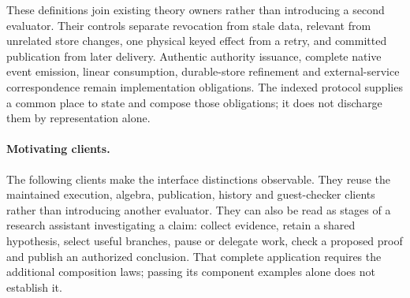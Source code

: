 \documentclass[11pt]{article}
\theoremstyle{definition}
\theoremstyle{remark}
\begin{document}
These definitions join existing theory owners rather than introducing a
second evaluator.  Their controls separate revocation from stale data,
relevant from unrelated store changes, one physical keyed effect from a retry,
and committed publication from later delivery.  Authentic authority issuance,
complete native event emission, linear consumption, durable-store refinement
and external-service correspondence remain implementation obligations.  The
indexed protocol supplies a common place to state and compose those
obligations; it does not discharge them by representation alone.

\paragraph{Motivating clients.}
The following clients make the interface distinctions observable. They reuse
the maintained execution, algebra, publication, history and guest-checker
clients rather than introducing another evaluator.
They can also be read as stages of a research assistant investigating a
claim: collect evidence, retain a shared hypothesis, select useful branches,
pause or delegate work, check a proposed proof and publish an authorized
conclusion. That complete application requires the additional composition
laws; passing its component examples alone does not establish it.
\end{document}
